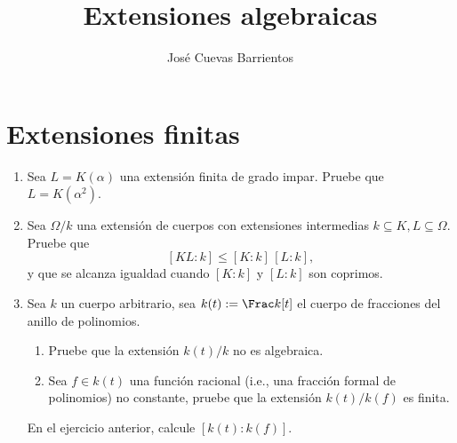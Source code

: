 \documentclass[11pt, reqno]{amsart}
\title{Extensiones algebraicas}
\date{\DTMdate{2025-03-20}}
\author{José Cuevas Barrientos}
\begin{document}
\maketitle

	

\section{Extensiones finitas}
\begin{enumerate}
	\item Sea $L = K(\alpha)$ una extensión finita de grado impar.
		Pruebe que $L = K(\alpha^2)$.

	\item Sea $\Omega/k$ una extensión de cuerpos con extensiones intermedias $k \subseteq K, L \subseteq \Omega$.
		Pruebe que
		\[
			[KL : k] \le [K : k] \, [L : k],
		\]
		y que se alcanza igualdad cuando $[K : k]$ y $[L : k]$ son coprimos.

	\item Sea $k$ un cuerpo arbitrario, sea $k(t) := \Frac k[t]$ el cuerpo de fracciones del anillo de polinomios.
		\begin{enumerate}
			\item Pruebe que la extensión $k(t)/k$ no es algebraica.
			\item Sea $f \in k(t)$ una función racional (i.e., una fracción formal de polinomios) no constante,
				pruebe que la extensión $k(t)/k(f)$ es finita.
		\end{enumerate}
		\begin{prob}
			En el ejercicio anterior, calcule $[k(t) : k(f)]$.
		\end{prob}
\end{enumerate}
\end{document}
